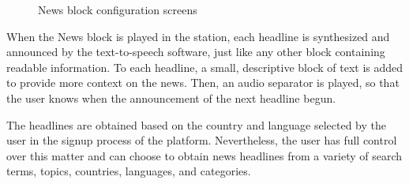 \begin{figure}[htbp]
	\centering
	 \qquad
	 \qquad
	\caption{News block configuration screens}
	\label{fig:mfp1}
\end{figure}


When the News block is played in the station, each headline is synthesized and announced by the text-to-speech software, just like any other block containing readable information. To each headline, a small, descriptive block of text is added to provide more context on the news. Then, an audio separator is played, so that the user knows when the announcement of the next headline begun.

The headlines are obtained based on the country and language selected by the user in the signup process of the platform. Nevertheless, the user has full control over this matter and can choose to obtain news headlines from a variety of search terms, topics, countries, languages, and categories.




